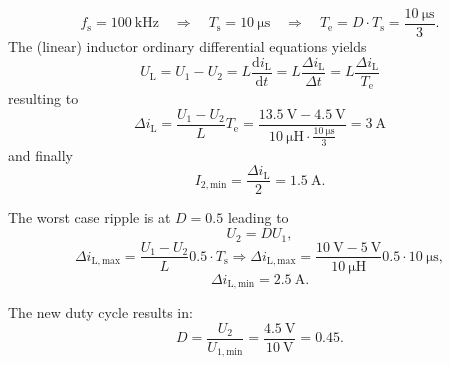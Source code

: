 \begin{solutionblock}
    \begin{equation}
        f_\mathrm{s} = \SI{ 100}{\kilo\hertz} \quad \Rightarrow \quad T_\mathrm{s} = \SI{ 10}{\micro\second} \quad \Rightarrow \quad T_\mathrm{e} = D \cdot T_\mathrm{s} = \frac{\SI{ 10}{\micro \second}}{3}.
    \end{equation}
    The (linear) inductor ordinary differential equations yields
    \begin{equation}
        U_\mathrm{L} = U_\mathrm{1} - U_\mathrm{2} = L \frac{\mathrm{d} i_\mathrm{L}}{\mathrm{d}t}  = L \frac{\Delta i_\mathrm{L}}{\Delta t} = L \frac{\Delta i_\mathrm{L}}{T_\mathrm{e}}
    \end{equation}
    resulting to
    \begin{equation}
        \Delta i_\mathrm{L} = \frac{U_\mathrm{1} - U_\mathrm{2}}{L} T_\mathrm{e} = \frac{\SI{13.5}{\volt} - \SI{4.5}{\volt}}{\SI{10}{\micro \henry} \cdot \frac{\SI{10}{\micro \second}}{3}} = \SI{3}{\ampere}
    \end{equation}
    and finally
    \begin{equation}
        I_{\mathrm{2,min}} = \frac{\Delta i_\mathrm{L}}{2} = \SI{1.5}{\ampere}.
    \end{equation}
\end{solutionblock}

\begin{solutionblock}
    The worst case ripple is at $D=0.5$ leading to
    \begin{equation}
        U_\mathrm{2} = D U_\mathrm{1},
    \end{equation}
    \begin{equation}
        \Delta i_\mathrm{L,max} = \frac{U_\mathrm{1} - U_\mathrm{2}}{L} 0.5 \cdot T_\mathrm{s}
        \Rightarrow \Delta i_\mathrm{L,max} = \frac{\SI{10}{\volt} - \SI{5}{\volt}}{\SI{10}{\micro \henry}} 0.5 \cdot \SI{10}{\micro \second},
    \end{equation}
    \begin{equation}
        \Delta i_{\mathrm{L,min}} = \SI{2.5}{\ampere}.
    \end{equation}
\end{solutionblock}

\begin{solutionblock}
    The new duty cycle results in:
    \begin{equation}    
        D= \frac{U_\mathrm{2}}{U_{\mathrm{1,min}}} = \frac{\SI{4.5}{\volt}}{\SI{10}{\volt}} = 0.45.
    \end{equation}    
\end{solutionblock}


